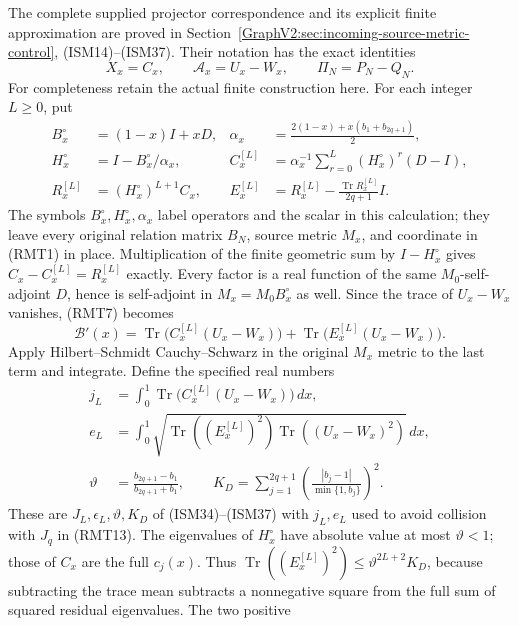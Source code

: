 The complete supplied projector correspondence and its explicit
finite approximation are proved in
Section~\ref{GraphV2:sec:incoming-source-metric-control}, (ISM14)--(ISM37).
Their notation has the exact identities
\[
 X_x=C_x,\qquad \mathcal A_x=U_x-W_x,\qquad
 \Pi_N=P_N-Q_N.
\]
For completeness retain the actual finite construction here.
For each integer \(L\geq0\), put
\[
 \begin{aligned}
 B_x^\circ&=(1-x)I+xD,&
 \alpha_x&=\frac{2(1-x)+x(b_1+b_{2q+1})}{2},\\
 H_x^\circ&=I-B_x^\circ/\alpha_x,&
 C_x^{[L]}&=\alpha_x^{-1}\sum_{r=0}^{L}
                      (H_x^\circ)^r(D-I),\\
 R_x^{[L]}&=(H_x^\circ)^{L+1}C_x,&
 E_x^{[L]}&=R_x^{[L]}-\frac{\operatorname{Tr}R_x^{[L]}}{2q+1}I.
 \end{aligned}
 \tag{RMT19}
\]
The symbols \(B_x^\circ,H_x^\circ,\alpha_x\) label operators and
the scalar in this calculation; they leave every original
relation matrix \(B_N\), source metric \(M_x\), and coordinate
in (RMT1) in place.  Multiplication of the finite geometric sum
by \(I-H_x^\circ\) gives
\(C_x-C_x^{[L]}=R_x^{[L]}\) exactly.  Every factor is a real
function of the same \(M_0\)-self-adjoint \(D\), hence is
self-adjoint in \(M_x=M_0B_x^\circ\) as well.  Since the
trace of \(U_x-W_x\) vanishes, (RMT7) becomes
\[
 \mathcal B'(x)=
 \operatorname{Tr}\bigl(C_x^{[L]}(U_x-W_x)\bigr)
 +\operatorname{Tr}\bigl(E_x^{[L]}(U_x-W_x)\bigr).
\]
Apply Hilbert--Schmidt Cauchy--Schwarz in the original \(M_x\)
metric to the last term and integrate.  Define the specified
real numbers
\[
 \begin{split}
 j_L&=\int_0^1\operatorname{Tr}
                    \bigl(C_x^{[L]}(U_x-W_x)\bigr)\,dx,\\
 e_L&=\int_0^1
  \sqrt{\operatorname{Tr}((E_x^{[L]})^2)
                      \operatorname{Tr}((U_x-W_x)^2)}\,dx,\\
 \vartheta&=\frac{b_{2q+1}-b_1}{b_{2q+1}+b_1},\qquad
 K_D=\sum_{j=1}^{2q+1}
          \left(\frac{|b_j-1|}{\min\{1,b_j\}}\right)^2 .
 \end{split}
 \tag{RMT20}
\]
These are \(J_L,\epsilon_L,\vartheta,K_D\) of (ISM34)--(ISM37)
with \(j_L,e_L\) used to avoid collision with \(J_q\) in
(RMT13).  The eigenvalues of \(H_x^\circ\) have absolute
value at most \(\vartheta<1\); those of \(C_x\) are the
full \(c_j(x)\).  Thus
\(\operatorname{Tr}((E_x^{[L]})^2)
\leq\vartheta^{2L+2}K_D\), because subtracting the trace mean
subtracts a nonnegative square from the full sum of
squared residual eigenvalues.  The two positive
